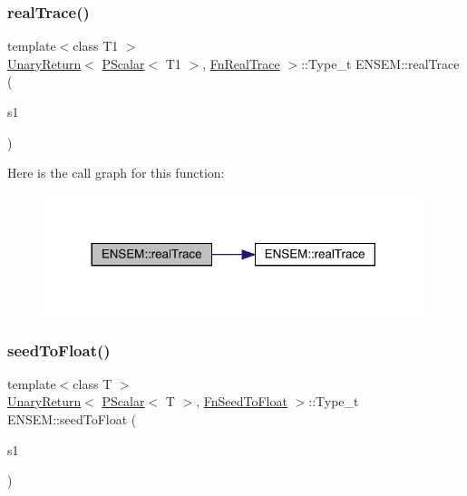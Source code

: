 \subsubsection{\texorpdfstring{realTrace()}{realTrace()}}
{\footnotesize\ttfamily template$<$class T1 $>$ \\
\mbox{\hyperlink{structENSEM_1_1UnaryReturn}{Unary\+Return}}$<$ \mbox{\hyperlink{classENSEM_1_1PScalar}{P\+Scalar}}$<$ T1 $>$, \mbox{\hyperlink{structENSEM_1_1FnRealTrace}{Fn\+Real\+Trace}} $>$\+::Type\+\_\+t E\+N\+S\+E\+M\+::real\+Trace (\begin{DoxyParamCaption}\item[{const \mbox{\hyperlink{classENSEM_1_1PScalar}{P\+Scalar}}$<$ T1 $>$ \&}]{s1 }\end{DoxyParamCaption})\hspace{0.3cm}{\ttfamily [inline]}}

Here is the call graph for this function\+:\nopagebreak
\begin{figure}[H]
\begin{center}
\leavevmode
\includegraphics[width=314pt]{db/dcc/group__primscalar_ga63efc63157b5fc9495798f0391c8e170_cgraph}
\end{center}
\end{figure}
\mbox{\label{group__primscalar_ga5a261606d393edcbce00c050e5a5cbd5}} 
\subsubsection{\texorpdfstring{seedToFloat()}{seedToFloat()}}
{\footnotesize\ttfamily template$<$class T $>$ \\
\mbox{\hyperlink{structENSEM_1_1UnaryReturn}{Unary\+Return}}$<$ \mbox{\hyperlink{classENSEM_1_1PScalar}{P\+Scalar}}$<$ T $>$, \mbox{\hyperlink{structENSEM_1_1FnSeedToFloat}{Fn\+Seed\+To\+Float}} $>$\+::Type\+\_\+t E\+N\+S\+E\+M\+::seed\+To\+Float (\begin{DoxyParamCaption}\item[{const \mbox{\hyperlink{classENSEM_1_1PScalar}{P\+Scalar}}$<$ T $>$ \&}]{s1 }\end{DoxyParamCaption})\hspace{0.3cm}{\ttfamily [inline]}}



